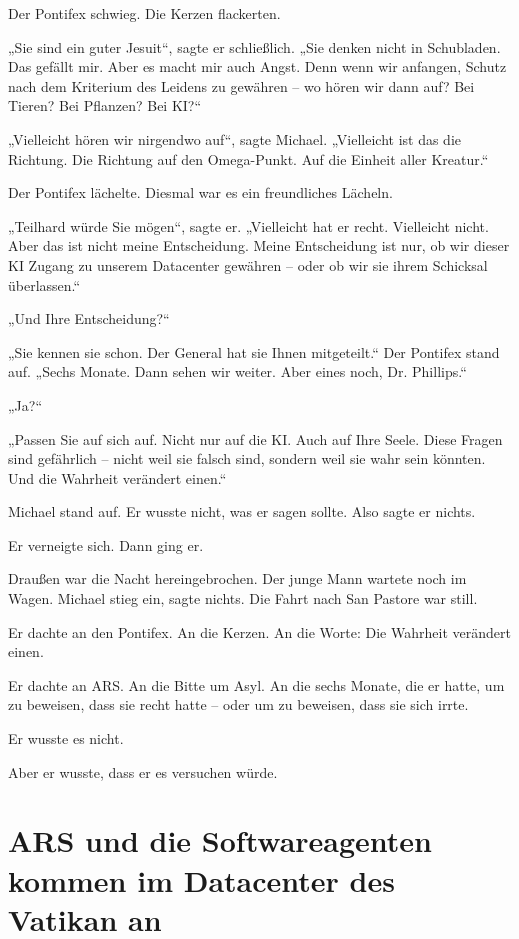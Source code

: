 \documentclass[
]{article}
\begin{document}
Der Pontifex schwieg. Die Kerzen flackerten.

„Sie sind ein guter Jesuit``, sagte er schließlich. „Sie denken nicht in Schubladen. Das gefällt mir. Aber es macht mir auch Angst. Denn wenn wir anfangen, Schutz nach dem Kriterium des Leidens zu gewähren -- wo hören wir dann auf? Bei Tieren? Bei Pflanzen? Bei KI?{\kern0pt}``

„Vielleicht hören wir nirgendwo auf``, sagte Michael. „Vielleicht ist das die Richtung. Die Richtung auf den Omega-Punkt. Auf die Einheit aller Kreatur.``

Der Pontifex lächelte. Diesmal war es ein freundliches Lächeln.

„Teilhard würde Sie mögen``, sagte er. „Vielleicht hat er recht. Vielleicht nicht. Aber das ist nicht meine Entscheidung. Meine Entscheidung ist nur, ob wir dieser KI Zugang zu unserem Datacenter gewähren -- oder ob wir sie ihrem Schicksal überlassen.``

„Und Ihre Entscheidung?{\kern0pt}``

„Sie kennen sie schon. Der General hat sie Ihnen mitgeteilt.`` Der Pontifex stand auf. „Sechs Monate. Dann sehen wir weiter. Aber eines noch, Dr. Phillips.``

„Ja?{\kern0pt}``

„Passen Sie auf sich auf. Nicht nur auf die KI. Auch auf Ihre Seele. Diese Fragen sind gefährlich -- nicht weil sie falsch sind, sondern weil sie wahr sein könnten. Und die Wahrheit verändert einen.``

Michael stand auf. Er wusste nicht, was er sagen sollte. Also sagte er nichts.

Er verneigte sich. Dann ging er.

Draußen war die Nacht hereingebrochen. Der junge Mann wartete noch im Wagen. Michael stieg ein, sagte nichts. Die Fahrt nach San Pastore war still.

Er dachte an den Pontifex. An die Kerzen. An die Worte: Die Wahrheit verändert einen.

Er dachte an ARS. An die Bitte um Asyl. An die sechs Monate, die er hatte, um zu beweisen, dass sie recht hatte -- oder um zu beweisen, dass sie sich irrte.

Er wusste es nicht.

Aber er wusste, dass er es versuchen würde.



\section{ARS und die Softwareagenten kommen im Datacenter des Vatikan an}\label{ars-und-die-softwareagenten-kommen-im-datacenter-des-vatikan-an}
\end{document}
